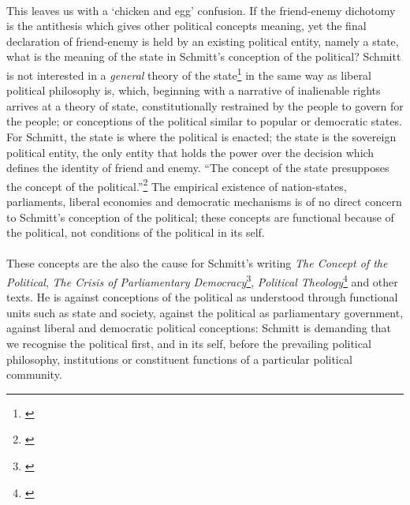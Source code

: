 \documentclass[12pt,a4paper,titlepage]{article}
\begin{document}
\paragraph{}This leaves us with a `chicken and egg' confusion. If the friend-enemy dichotomy is the antithesis which gives other political concepts meaning, yet the final declaration of friend-enemy is held by an existing political entity, namely a state, what is the meaning of the state in Schmitt's conception of the political? Schmitt is not interested in a \emph{general} theory of the state\footnote{\cite[p.820]{Frye1996}} in the same way as liberal political philosophy is, which, beginning with a narrative of inalienable rights arrives at a theory of state, constitutionally restrained by the people to govern for the people; or conceptions of the political similar to popular or democratic states. For Schmitt, the state is where the political is enacted; the state is the sovereign political entity, the only entity that holds the power over the decision which defines the identity of friend and enemy. ``The concept of the state presupposes the concept of the political.''\footnote{\cite[p.1]{schmitt:2007cop}} The empirical existence of nation-states, parliaments, liberal economies and democratic mechanisms is of no direct concern to Schmitt's conception of the political; these concepts are functional because of the political, not conditions of the political in its self.

\paragraph{}These concepts are the also the cause for Schmitt's writing \textit{The Concept of the Political}, \textit{The Crisis of Parliamentary Democracy}\footnote{\cite{schmitt:1985pd}}, \textit{Political Theology}\footnote{\cite{schmitt:2005pt}} and other texts. He is against conceptions of the political as understood through functional units such as state and society, against the political as parliamentary government, against liberal and democratic political conceptions: Schmitt is demanding that we recognise the political first, and in its self, before the prevailing political philosophy, institutions or constituent functions of a particular political community. 
\end{document}
